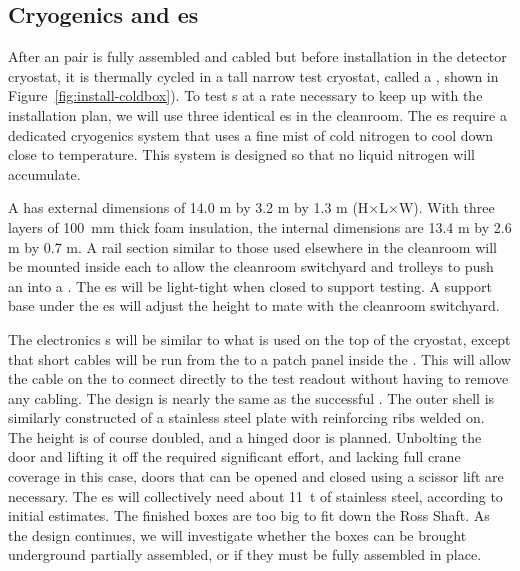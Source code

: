 \subsection{Cryogenics and \Coldbox{}es}
\label{sec:fdsp-tc-infr-cryo}



After an  pair is fully assembled and cabled but before installation in the detector cryostat, it is thermally cycled in a tall narrow test cryostat, called a \coldbox{}, shown in Figure~\ref{fig:install-coldbox}). 
To test s at a rate necessary to keep up with the installation plan, we will use three identical \coldbox{}es in the cleanroom. 
The \coldbox{}es require a dedicated cryogenics system that uses a fine mist of cold nitrogen to cool down close to  temperature. This system is designed so that no liquid nitrogen will accumulate. 


A \coldbox has external dimensions of 14.0 \si{m} by 3.2 \si{m} by 1.3 \si{m} (H$\times$L$\times$W). With three layers of \SI{100}{mm} thick foam insulation,  
the internal dimensions are 13.4 \si{m} by 2.6 \si{m} by 0.7 \si{m}. A rail section similar to those used elsewhere in the cleanroom will be mounted inside each \coldbox to allow the cleanroom switchyard and trolleys to push an    into a \coldbox. The \coldbox{}es will be light-tight when closed to support  testing. A support base under the \coldbox{}es will adjust the height to mate with the cleanroom switchyard.

 
The \coldbox electronics \fdth{}s  will be  similar to what is used on the top of the  cryostat, except that short cables will be run from the   to a patch panel inside the \coldbox. This will allow the cable on the  to connect directly to the test readout without having to remove any cabling. The \coldbox  design is nearly the same as the successful  \coldbox. The outer shell is similarly constructed of a stainless steel plate with reinforcing ribs welded on. The height is of course doubled, and a hinged door is planned. Unbolting the door and lifting it off the  \coldbox required significant effort, and lacking full crane coverage in this case, doors that can be opened and closed using a scissor lift are necessary. The  \coldbox{}es will collectively need about \SI{11}{t} of stainless steel, according to initial estimates. The finished boxes are too big to fit down the Ross Shaft. As the design continues, 
we will investigate whether the boxes can be brought underground partially assembled, or if they must be fully assembled in place.  

